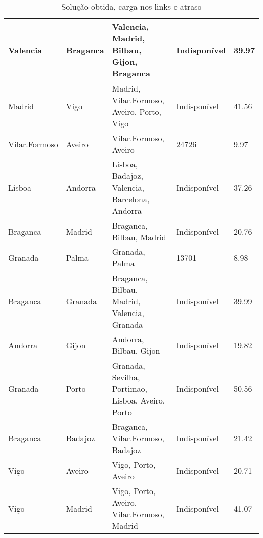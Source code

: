 \begin{table}[!htb]
{\begin{tabular}{|l|l|l|l|l|}
Valencia & Braganca & Valencia, Madrid, Bilbau, Gijon, Braganca & Indisponível & 39.97 \\ \hline
Madrid & Vigo & Madrid, Vilar.Formoso, Aveiro, Porto, Vigo & Indisponível & 41.56 \\ \hline
Vilar.Formoso & Aveiro & Vilar.Formoso, Aveiro & 24726 & 9.97 \\ \hline
Lisboa & Andorra & Lisboa, Badajoz, Valencia, Barcelona, Andorra & Indisponível & 37.26 \\ \hline
Braganca & Madrid & Braganca, Bilbau, Madrid & Indisponível & 20.76 \\ \hline
Granada & Palma & Granada, Palma & 13701 & 8.98 \\ \hline
Braganca & Granada & Braganca, Bilbau, Madrid, Valencia, Granada & Indisponível & 39.99 \\ \hline
Andorra & Gijon & Andorra, Bilbau, Gijon & Indisponível & 19.82 \\ \hline
Granada & Porto & Granada, Sevilha, Portimao, Lisboa, Aveiro, Porto & Indisponível & 50.56 \\ \hline
Braganca & Badajoz & Braganca, Vilar.Formoso, Badajoz & Indisponível & 21.42 \\ \hline
Vigo & Aveiro & Vigo, Porto, Aveiro & Indisponível & 20.71 \\ \hline
Vigo & Madrid & Vigo, Porto, Aveiro, Vilar.Formoso, Madrid & Indisponível & 41.07 \\ \hline
\end{tabular}}
\caption[]{Solução obtida, carga nos links e atraso}
\end{table}

